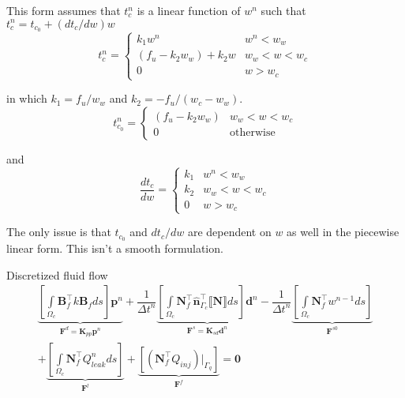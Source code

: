 \documentclass{article}
\begin{document}
This form assumes that $t_c^n$ is a linear function of $w^n$ such that $t_c^n = t_{c_0} + (dt_c/dw) w$
\begin{equation}
	t_c^n = 
	\begin{cases}
		k_1 w^n & w^n < w_w \\
		(f_u - k_2 w_w) + k_2 w & w_w < w < w_c \\
		0 & w > w_c
	\end{cases}
\end{equation}

in which $k_1 = f_u/w_w$ and $k_2 = -f_u/(w_c - w_w)$.
\begin{equation}
t_{c_0}^n = 
\begin{cases}
(f_u - k_2 w_w) & w_w < w < w_c \\
0 & \text{otherwise}
\end{cases}
\end{equation}

and 
\begin{equation}
\dfrac{dt_c}{dw} = 
\begin{cases}
k_1 & w^n < w_w \\
k_2 & w_w < w < w_c \\
0 & w > w_c
\end{cases}
\end{equation}

The only issue is that $t_{c_0}$ and $dt_c/dw$ are dependent on $w$ as well in the piecewise linear form. 
This isn't a smooth formulation.

Discretized fluid flow
\begin{equation}
\begin{gathered}
\underbrace{\left[\int\limits_{\Omega_c}
	\mathbf{B}_f^\top k \mathbf{B}_f ds 
	\right] \mathbf{p}^n}_{\mathbf{F}^d = \mathbf{K}_{pp} \mathbf{p}^n}
+
\dfrac{1}{\Delta t^n}
\underbrace{\left[
	\int\limits_{\Omega_c} \mathbf{N}_f^\top \hat{\mathbf{n}}_{\Gamma_c}^{\top}\llbracket \mathbf{N} \rrbracket  ds 
	\right] \mathbf{d}^n}_{\mathbf{F}^s = \mathbf{K}_{sd} \mathbf{d}^n}
- 
\dfrac{1}{\Delta t^n}
\underbrace{\left[
	\int\limits_{\Omega_c} \mathbf{N}_f^\top w^{n-1} ds 
	\right]}_{\mathbf{F}^{s0}}
	\\
+
\underbrace{\left[
	\int\limits_{\Omega_c} \mathbf{N}_f^{\top} Q_{leak}^n ds
	\right]}_{\mathbf{F}^l}
+
\underbrace{\left[
	\left(\mathbf{N}_f^{\top} Q_{inj} \right) \Big\rvert_{\Gamma_q} 
	\right]}_{\mathbf{F}^f}
= \mathbf{0} 
\end{gathered}
\end{equation}
\end{document}
